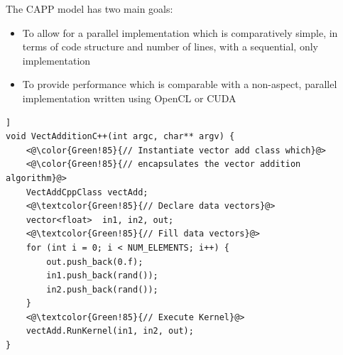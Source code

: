 \documentclass{sig-alternate-05-2015}
\begin{document}
The CAPP model has two main goals:
\begin{itemize}
	\item{To allow for a parallel implementation 
			which is comparatively simple, in terms of code structure and number
			of lines, with a sequential, \CPP only implementation
		}
	\item{To provide performance which is comparable with a non-aspect, parallel
			implementation written using OpenCL or CUDA
		}
\end{itemize}


\begin{lstlisting}[caption=Vector addition on the host using
\CPP.,label=vectcpp,float=[t!]]
void VectAdditionC++(int argc, char** argv) {
	<@\color{Green!85}{// Instantiate vector add class which}@>
	<@\color{Green!85}{// encapsulates the vector addition algorithm}@>
	VectAddCppClass vectAdd;
	<@\textcolor{Green!85}{// Declare data vectors}@>
	vector<float>  in1, in2, out;
	<@\textcolor{Green!85}{// Fill data vectors}@>
	for (int i = 0; i < NUM_ELEMENTS; i++) {
		out.push_back(0.f);
		in1.push_back(rand());
		in2.push_back(rand());
	}
	<@\textcolor{Green!85}{// Execute Kernel}@>
	vectAdd.RunKernel(in1, in2, out);
}
\end{lstlisting}
\end{document}
